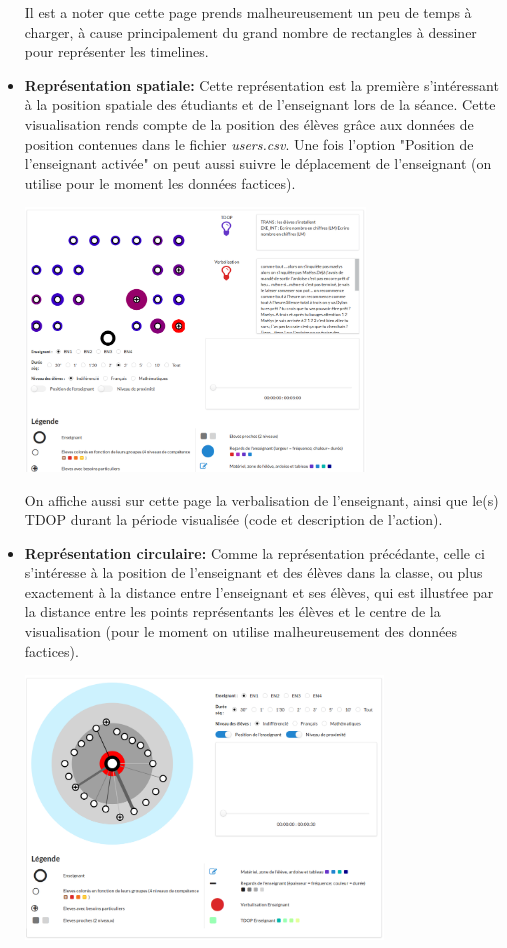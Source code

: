 \documentclass{article}
\begin{document}
\begin{itemize}
\begin{center}
        \end{center}
        Il est a noter que cette page prends malheureusement un peu de temps à charger, à cause principalement du grand nombre de rectangles à dessiner pour représenter les timelines.\\
    \item \textbf{Représentation spatiale:} Cette représentation est la première s'intéressant à la position spatiale des étudiants et de l'enseignant lors de la séance. Cette visualisation rends compte de la position des élèves grâce aux données de position contenues dans le fichier \textit{users.csv}. Une fois l'option "Position de l'enseignant activée" on peut aussi suivre le déplacement de l'enseignant (on utilise pour le moment les données factices).
        \begin{center}
            \includegraphics[height=7cm]{rep_spatiale.png}
        \end{center}
        On affiche aussi sur cette page la verbalisation de l'enseignant, ainsi que le(s) TDOP durant la période visualisée (code et description de l'action).
    \item \textbf{Représentation circulaire:} Comme la représentation précédante, celle ci s'intéresse à la position de l'enseignant et des élèves dans la classe, ou plus exactement à la distance entre l'enseignant et ses élèves, qui est illustŕee par la distance entre les points représentants les élèves et le centre de la visualisation (pour le moment on utilise malheureusement des données factices). 
        \begin{center}
            \includegraphics[height=7cm]{rep_circulaire.png}

\end{center}
\end{itemize}
\end{document}

